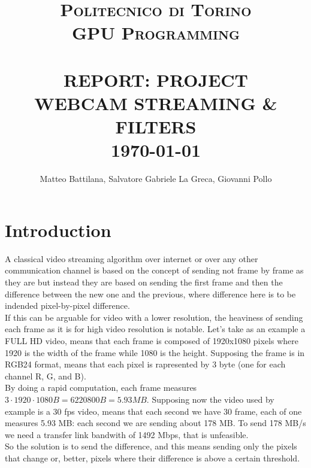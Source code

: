 \documentclass[paper=a4, fontsize=10pt]{scrartcl}	%
\title{	\normalsize \textsc{Politecnico di Torino\\GPU Programming} 	%
	\\[2.0cm]								%
	\HRule{0.5pt} \\						%
	\LARGE \textbf{\uppercase{Report: PROJECT\\Webcam streaming \& filters}}	%
	\HRule{2pt} \\ [0.5cm]		%
	\normalsize 
	\today %
}
\author{
	Matteo Battilana, Salvatore Gabriele La Greca, Giovanni Pollo
}
\makeatletter
\def\printtitle{%
	{\centering \@title\par}}
\def\printauthor{%
	{\centering \large \@author}}
\makeatother
\begin{document}
	\thispagestyle{empty}		%
	
	\printtitle					%
	\vfill
	\printauthor				%
	\newpage


	\thispagestyle{empty}		%
	\tableofcontents
	\newpage

	\setcounter{page}{1}		%
	\section{Introduction}

	A classical video streaming algorithm over internet or over any other communication channel is based on the concept of sending not frame by frame as they are but instead they are based on sending the first frame and then the difference between the new one and the previous, where difference here is to be indended pixel-by-pixel difference.\\
	
	If this can be arguable for video with a lower resolution, the heaviness of sending each frame as it is for high video resolution is notable. Let's take as an example a FULL HD video, means that each frame is composed of 1920x1080 pixels where 1920 is the width of the frame while 1080 is the height. Supposing the frame is in RGB24 format, means that each pixel is rapresented by 3 byte (one for each channel R, G, and B).\\
	
	By doing a rapid computation, each frame measures $3 \cdot 1920 \cdot 1080 B = 6220800 B = 5.93 MB $. Supposing now the video used by example is a 30 fps video, means that each second we have 30 frame, each of one measures 5.93 MB: each second we are sending about 178 MB. To send 178 MB/s we need a transfer link bandwith of 1492 Mbps, that is unfeasible.\\
	
	So the solution is to send the difference, and this means sending only the pixels that change or, better, pixels where their difference is above a certain threshold. \\
\end{document}

